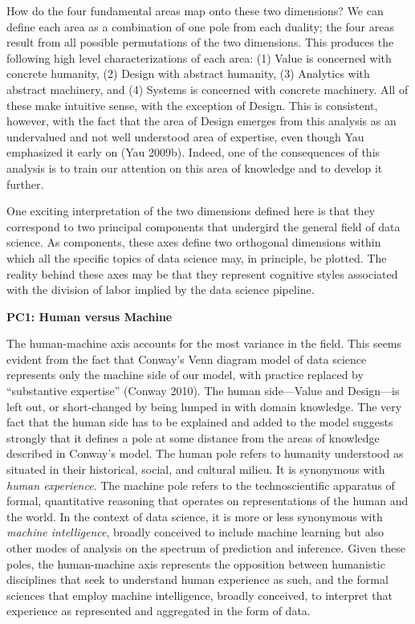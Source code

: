 \documentclass[
  letterpaper,
]{report}
\begin{document}
How do the four fundamental areas map onto these two dimensions? We can
define each area as a combination of one pole from each duality; the
four areas result from all possible permutations of the two dimensions.
This produces the following high level characterizations of each area:
(1) Value is concerned with concrete humanity, (2) Design with abstract
humanity, (3) Analytics with abstract machinery, and (4) Systems is
concerned with concrete machinery. All of these make intuitive sense,
with the exception of Design. This is consistent, however, with the fact
that the area of Design emerges from this analysis as an undervalued and
not well understood area of expertise, even though Yau emphasized it
early on (Yau 2009b). Indeed, one of the consequences of this analysis
is to train our attention on this area of knowledge and to develop it
further.

One exciting interpretation of the two dimensions defined here is that
they correspond to two principal components that undergird the general
field of data science. As components, these axes define two orthogonal
dimensions within which all the specific topics of data science may, in
principle, be plotted. The reality behind these axes may be that they
represent cognitive styles associated with the division of labor implied
by the data science pipeline.

\textbf{PC1: Human versus Machine}

The human-machine axis accounts for the most variance in the field. This
seems evident from the fact that Conway's Venn diagram model of data
science represents only the machine side of our model, with practice
replaced by ``substantive expertise'' (Conway 2010). The human
side---Value and Design---is left out, or short-changed by being lumped
in with domain knowledge. The very fact that the human side has to be
explained and added to the model suggests strongly that it defines a
pole at some distance from the areas of knowledge described in Conway's
model. The human pole refers to humanity understood as situated in their
historical, social, and cultural milieu. It is synonymous with
\emph{human experience}. The machine pole refers to the technoscientific
apparatus of formal, quantitative reasoning that operates on
representations of the human and the world. In the context of data
science, it is more or less synonymous with \emph{machine intelligence},
broadly conceived to include machine learning but also other modes of
analysis on the spectrum of prediction and inference. Given these poles,
the human-machine axis represents the opposition between humanistic
disciplines that seek to understand human experience as such, and the
formal sciences that employ machine intelligence, broadly conceived, to
interpret that experience as represented and aggregated in the form of
data.
\end{document}

